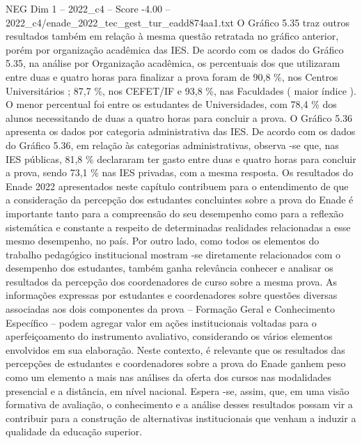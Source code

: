 \begin{textsample}{NEG Dim 1 – 2022\_c4 – Score -4.00 – 2022\_c4/enade\_2022\_tec\_gest\_tur\_eadd874aa1.txt}
O Gráfico 5.35 traz outros resultados também em relação à mesma questão retratada no gráfico anterior, porém por organização acadêmica das IES.
De acordo com os dados do Gráfico 5.35, na análise por Organização acadêmica, os percentuais dos que utilizaram entre duas e quatro horas para finalizar a prova foram de 90,8 \%, nos Centros Universitários ; 87,7 \%, nos CEFET/IF e 93,8 \%, nas Faculdades ( maior índice ).
O menor percentual foi entre os estudantes de Universidades, com 78,4 \% dos alunos necessitando de duas a quatro horas para concluir a prova.
O Gráfico 5.36 apresenta os dados por categoria administrativa das IES.
De acordo com os dados do Gráfico 5.36, em relação às categorias administrativas, observa -se que, nas IES públicas, 81,8 \% declararam ter gasto entre duas e quatro horas para concluir a prova, sendo 73,1 \% nas IES privadas, com a mesma resposta.
Os resultados do Enade 2022 apresentados neste capítulo contribuem para o entendimento de que a consideração da percepção dos estudantes concluintes sobre a prova do Enade é importante tanto para a compreensão do seu desempenho como para a reflexão sistemática e constante a respeito de determinadas realidades relacionadas a esse mesmo desempenho, no país.
Por outro lado, como todos os elementos do trabalho pedagógico institucional mostram -se diretamente relacionados com o desempenho dos estudantes, também ganha relevância conhecer e analisar os resultados da percepção dos coordenadores de curso sobre a mesma prova.
As informações expressas por estudantes e coordenadores sobre questões diversas associadas aos dois componentes da prova – Formação Geral e Conhecimento Específico – podem agregar valor em ações institucionais voltadas para o aperfeiçoamento do instrumento avaliativo, considerando os vários elementos envolvidos em sua elaboração.
Neste contexto, é relevante que os resultados das percepções de estudantes e coordenadores sobre a prova do Enade ganhem peso como um elemento a mais nas análises da oferta dos cursos nas modalidades presencial e a distância, em nível nacional.
Espera -se, assim, que, em uma visão formativa de avaliação, o conhecimento e a análise desses resultados possam vir a contribuir para a construção de alternativas institucionais que venham a induzir a qualidade da educação superior.

\end{textsample}
